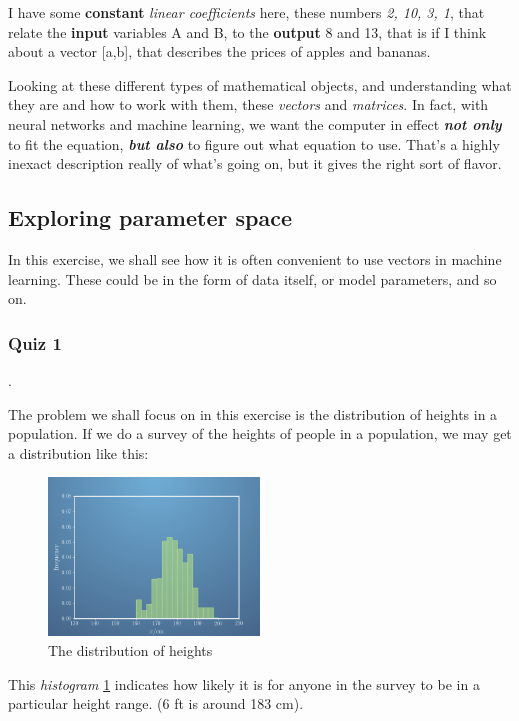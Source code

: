 \documentclass[]{article}
\begin{document}
I have some \textbf{constant} \textit{linear coefficients} here, these numbers \textit{2, 10, 3, 1}, that relate the \textbf{input} variables A and B, to the \textbf{output} 8 and 13, that is if I think about a vector [a,b], that describes the prices of apples and bananas.

Looking at these different types of mathematical objects, and understanding what they are and how to work with them, these \textit{vectors} and \textit{matrices}. In fact, with neural networks and machine learning, we want the computer in effect \textbf{\textit{not only}} to fit the equation, \textbf{\textit{but also}} to figure out what equation to use. That's a highly inexact description really of what's going on, but it gives the right sort of flavor.

\subsection{Exploring parameter space}

In this exercise, we shall see how it is often convenient to use vectors in machine learning. These could be in the form of data itself, or model parameters, and so on.

\subsubsection{Quiz 1}.

The problem we shall focus on in this exercise is the distribution of heights in a population. If we do a survey of the heights of people in a population, we may get a distribution like this:

\begin{figure}[h]
	\centering
	\includegraphics[width=0.5\textwidth]{height_dist}
	\caption{The distribution of heights}
	\label{fig:height_dist}
\end{figure}

This \textit{histogram} \ref{fig:height_dist} indicates how likely it is for anyone in the survey to be in a particular height range. (6 ft is around 183 cm).
\end{document}
